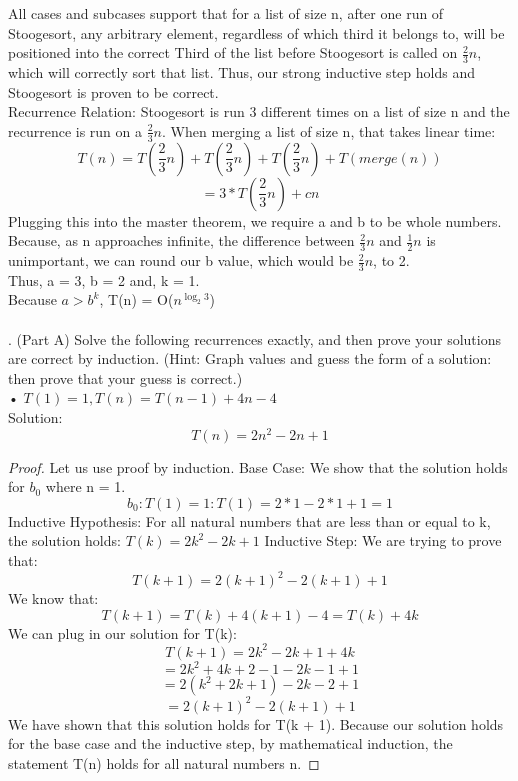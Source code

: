 \documentclass[11pt, solution, letterpaper]{format}
\begin{document}
All cases and subcases support that for a list of size n, after one run of Stoogesort, any arbitrary element, regardless of which third it belongs to, will be positioned into the correct Third of the list before Stoogesort is called on $\frac{2}{3}n$, which will correctly sort that list. Thus, our strong inductive step holds and Stoogesort is proven to be correct. \\

Recurrence Relation:
Stoogesort is run 3 different times on a list of size n and the recurrence is run on a $\frac{2}{3}n$. When merging a list of size n, that takes linear time:
$$T(n) = T(\frac{2}{3}n) + T(\frac{2}{3}n) + T(\frac{2}{3}n) + T(merge(n))$$
$$ =  3*T(\frac{2}{3}n) + cn $$
Plugging this into the master theorem, we require a and b to be whole numbers. Because, as n approaches infinite, the difference between $\frac{2}{3}n$ and $\frac{1}{2}n$ is unimportant, we can round our b value, which would be $\frac{2}{3}n$, to 2.\\


Thus, a = 3, b = 2 and, k = 1. \\Because $a > b^k$, T(n) = O($n^{\log_{2}{3}}$) \\
\\




. (Part A) Solve the following recurrences exactly, and then prove your solutions are correct by induction. (Hint:
Graph values and guess the form of a solution: then prove that your guess is correct.) \\
• $T(1) = 1,T(n) = T(n-1) +4n - 4$ \\
Solution: $$T(n) = 2n^2 - 2n + 1 $$
\begin{proof}
Let us use proof by induction. 
Base Case: We show that the solution holds for $b_0$ where n = 1. $$b_0: T(1) = 1: T(1) = 2*1 - 2*1 + 1 = 1 $$ 
Inductive Hypothesis: For all natural numbers that are less than or equal to k, the solution holds:
$T(k) = 2k^2 - 2k + 1 $
Inductive Step: We are trying to prove that:
$$T(k + 1) = 2(k + 1)^2 - 2(k + 1) + 1 $$
We know that:
$$T(k + 1) = T(k) + 4(k + 1) - 4 = T(k) + 4k $$
We can plug in our solution for T(k):
$$T(k + 1) = 2k^2 - 2k + 1 + 4k$$
$$ = 2k^2 + 4k + 2 - 1 - 2k - 1 + 1$$
$$ = 2(k^2 + 2k + 1) -2k - 2 + 1 $$
$$ = 2(k + 1)^2 - 2(k + 1) + 1 $$
We have shown that this solution holds for T(k + 1). Because our solution holds for the base case and the inductive step, by mathematical induction, the statement T(n) holds for all natural numbers n.
\end{proof}
\end{document}
